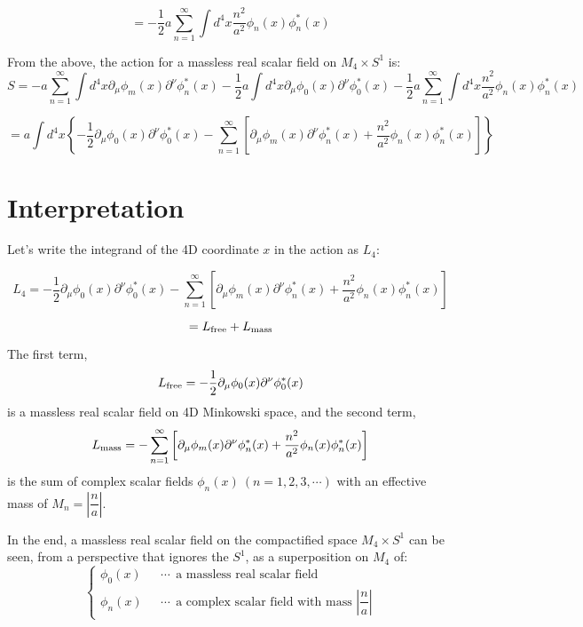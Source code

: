 \documentclass{article}
\begin{document}
$$
	=
	- \dfrac{1}{2}
	a
	\sum_{n=1}^{\infty}
	\int d^{4} x
	\dfrac{ n^{2} }{ a^{2} }
	\phi_{n}(x)
	\phi_{n}^{*}(x)
$$

From the above, the action for a massless real scalar field on $M_{4} \times S^{1}$ is:
$$
	S
	=
	-a
	\sum_{n=1}^{\infty}
	\int d^{4} x
	\partial_{\mu}
	\phi_{m}(x)
	\partial^{\nu}
	\phi_{n}^{*}(x)
	-
	\dfrac{1}{2}
	a
	\int d^{4} x
	\partial_{\mu}
	\phi_{0}(x)
	\partial^{\nu}
	\phi_{0}^{*}(x)
	- \dfrac{1}{2}
	a
	\sum_{n=1}^{\infty}
	\int d^{4} x
	\dfrac{ n^{2} }{ a^{2} }
	\phi_{n}(x)
	\phi_{n}^{*}(x)
$$

$$
	=
	a
	\int d^{4} x
	\left\{
	-
	\dfrac{1}{2}
	\partial_{\mu}
	\phi_{0}(x)
	\partial^{\nu}
	\phi_{0}^{*}(x)
	-
	\sum_{n=1}^{\infty}
	\left[
		\partial_{\mu}
		\phi_{m}(x)
		\partial^{\nu}
		\phi_{n}^{*}(x)
		+
		\dfrac{ n^{2} }{ a^{2} }
		\phi_{n}(x)
		\phi_{n}^{*}(x)
		\right]
	\right\}
$$

\section{Interpretation}

Let's write the integrand of the 4D coordinate $x$ in the action as $L_{4}$:

$$
	L_{4}
	=
	-
	\dfrac{1}{2}
	\partial_{\mu}
	\phi_{0}(x)
	\partial^{\nu}
	\phi_{0}^{*}(x)
	-
	\sum_{n=1}^{\infty}
	\left[
		\partial_{\mu}
		\phi_{m}(x)
		\partial^{\nu}
		\phi_{n}^{*}(x)
		+
		\dfrac{ n^{2} }{ a^{2} }
		\phi_{n}(x)
		\phi_{n}^{*}(x)
		\right]
$$

$$
	=
	L_{\rm free}
	+
	L_{\rm mass}
$$

The first term,
$$
	L_{\rm free}
	=
	-
	\dfrac{1}{2}
	\partial_{\mu}
	\phi_{0}(x)
	\partial^{\nu}
	\phi_{0}^{*}(x)
$$
is a massless real scalar field on 4D Minkowski space, and the second term,
$$
	L_{\rm mass}
	=
	-
	\sum_{n=1}^{\infty}
	\left[
		\partial_{\mu}
		\phi_{m}(x)
		\partial^{\nu}
		\phi_{n}^{*}(x)
		+
		\dfrac{ n^{2} }{ a^{2} }
		\phi_{n}(x)
		\phi_{n}^{*}(x)
		\right]
$$
is the sum of complex scalar fields $\phi_{n}(x) \ ( n=1,2,3, \cdots )$ with an effective mass of $M_{n} = \left| \dfrac{n}{a} \right|$.

In the end, a massless real scalar field on the compactified space $M_{4} \times S^{1}$ can be seen, from a perspective that ignores the $S^{1}$, as a superposition on $M_{4}$ of:
\begin{equation*}
	\begin{cases}
		\phi_{0}(x) & \ \ \ \cdots \ \ \text{a massless real scalar field}                                  \\
		\phi_{n}(x) & \ \ \ \cdots \ \ \text{a complex scalar field with mass } \left| \dfrac{n}{a} \right|
	\end{cases}
\end{equation*}
\end{document}
